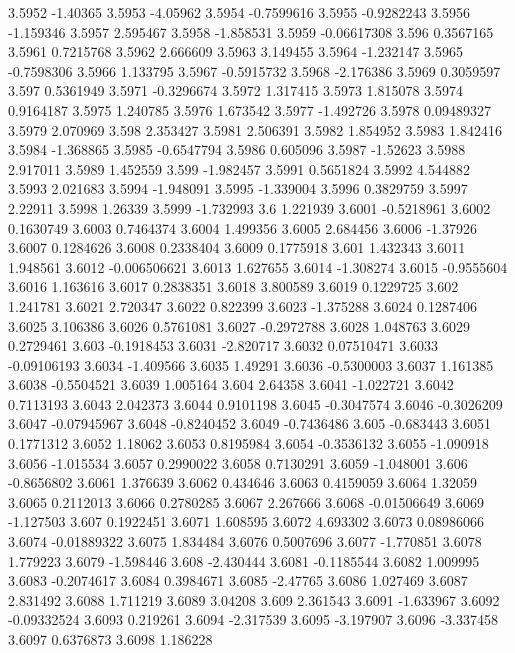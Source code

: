 3.5952  -1.40365
3.5953  -4.05962
3.5954  -0.7599616
3.5955  -0.9282243
3.5956  -1.159346
3.5957  2.595467
3.5958  -1.858531
3.5959  -0.06617308
3.596  0.3567165
3.5961  0.7215768
3.5962  2.666609
3.5963  3.149455
3.5964  -1.232147
3.5965  -0.7598306
3.5966  1.133795
3.5967  -0.5915732
3.5968  -2.176386
3.5969  0.3059597
3.597  0.5361949
3.5971  -0.3296674
3.5972  1.317415
3.5973  1.815078
3.5974  0.9164187
3.5975  1.240785
3.5976  1.673542
3.5977  -1.492726
3.5978  0.09489327
3.5979  2.070969
3.598  2.353427
3.5981  2.506391
3.5982  1.854952
3.5983  1.842416
3.5984  -1.368865
3.5985  -0.6547794
3.5986  0.605096
3.5987  -1.52623
3.5988  2.917011
3.5989  1.452559
3.599  -1.982457
3.5991  0.5651824
3.5992  4.544882
3.5993  2.021683
3.5994  -1.948091
3.5995  -1.339004
3.5996  0.3829759
3.5997  2.22911
3.5998  1.26339
3.5999  -1.732993
3.6  1.221939
3.6001  -0.5218961
3.6002  0.1630749
3.6003  0.7464374
3.6004  1.499356
3.6005  2.684456
3.6006  -1.37926
3.6007  0.1284626
3.6008  0.2338404
3.6009  0.1775918
3.601  1.432343
3.6011  1.948561
3.6012  -0.006506621
3.6013  1.627655
3.6014  -1.308274
3.6015  -0.9555604
3.6016  1.163616
3.6017  0.2838351
3.6018  3.800589
3.6019  0.1229725
3.602  1.241781
3.6021  2.720347
3.6022  0.822399
3.6023  -1.375288
3.6024  0.1287406
3.6025  3.106386
3.6026  0.5761081
3.6027  -0.2972788
3.6028  1.048763
3.6029  0.2729461
3.603  -0.1918453
3.6031  -2.820717
3.6032  0.07510471
3.6033  -0.09106193
3.6034  -1.409566
3.6035  1.49291
3.6036  -0.5300003
3.6037  1.161385
3.6038  -0.5504521
3.6039  1.005164
3.604  2.64358
3.6041  -1.022721
3.6042  0.7113193
3.6043  2.042373
3.6044  0.9101198
3.6045  -0.3047574
3.6046  -0.3026209
3.6047  -0.07945967
3.6048  -0.8240452
3.6049  -0.7436486
3.605  -0.683443
3.6051  0.1771312
3.6052  1.18062
3.6053  0.8195984
3.6054  -0.3536132
3.6055  -1.090918
3.6056  -1.015534
3.6057  0.2990022
3.6058  0.7130291
3.6059  -1.048001
3.606  -0.8656802
3.6061  1.376639
3.6062  0.434646
3.6063  0.4159059
3.6064  1.32059
3.6065  0.2112013
3.6066  0.2780285
3.6067  2.267666
3.6068  -0.01506649
3.6069  -1.127503
3.607  0.1922451
3.6071  1.608595
3.6072  4.693302
3.6073  0.08986066
3.6074  -0.01889322
3.6075  1.834484
3.6076  0.5007696
3.6077  -1.770851
3.6078  1.779223
3.6079  -1.598446
3.608  -2.430444
3.6081  -0.1185544
3.6082  1.009995
3.6083  -0.2074617
3.6084  0.3984671
3.6085  -2.47765
3.6086  1.027469
3.6087  2.831492
3.6088  1.711219
3.6089  3.04208
3.609  2.361543
3.6091  -1.633967
3.6092  -0.09332524
3.6093  0.219261
3.6094  -2.317539
3.6095  -3.197907
3.6096  -3.337458
3.6097  0.6376873
3.6098  1.186228
